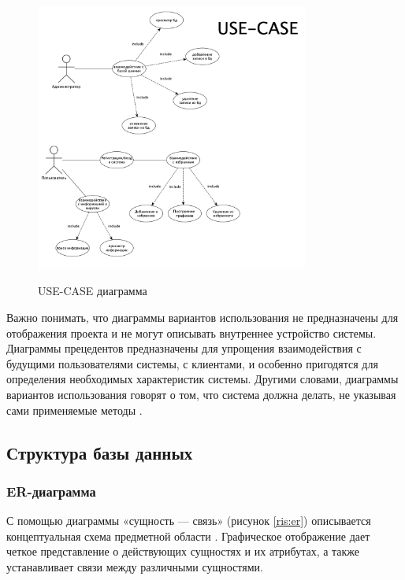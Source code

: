 \documentclass[a4paper,14pt]{extarticle}
\begin{document}
 	\begin{figure}[h!]
 		\begin{center}
 			{\includegraphics[width = 0.8\textwidth]{diagram/USE-CASE.png}}
 			\caption{
 				USE-CASE диаграмма}
 			\label{ris:use}
 		\end{center}
 	\end{figure}

 	
 	Важно понимать, что диаграммы вариантов использования не предназначены для отображения проекта и не могут описывать внутреннее устройство системы. Диаграммы прецедентов предназначены для упрощения взаимодействия с будущими пользователями системы, с клиентами, и особенно пригодятся для определения необходимых характеристик системы. Другими словами, диаграммы вариантов использования говорят о том, что система должна делать, не указывая сами применяемые методы \cite{usecase}.
 	
 	\subsection{Структура базы данных}
 	
 	\subsubsection{ER-диаграмма}
 	
 	С помощью диаграммы «сущность — связь» (рисунок \ref{ris:er}) описывается концептуальная схема предметной области \cite{er}.
 	Графическое отображение дает четкое представление о действующих сущностях и их атрибутах, а также устанавливает связи между различными сущностями.
 	
\end{document}
